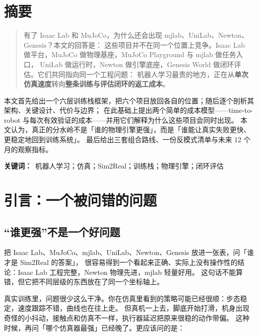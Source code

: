 \documentclass[UTF8, 11pt, a4paper, fontset=windows]{ctexart}
\begin{document}
\section*{摘要}

\begin{quote}
\noindent
有了 Isaac Lab 和 MuJoCo，为什么还会出现 mjlab、UniLab、Newton、Genesis？本文的回答是：
这些项目并不在同一个位置上竞争。Isaac Lab 做平台，MuJoCo 做物理基座，MuJoCo Playground 与 mjlab 做任务入口，
UniLab 做运行时，Newton 做引擎底座，Genesis World 做闭环评估。它们共同指向同一个工程问题：
机器人学习最贵的地方，正在从\textbf{单次仿真速度}转向\textbf{整条训练与评估闭环的返工成本}。
\end{quote}

\noindent
本文首先给出一个六层训练栈框架，把六个项目放回各自的位置；随后逐个剖析其架构、关键设计、代价与边界；
在此基础上提出两个简单的成本模型——time-to-robot 与每次有效验证的成本——并用它们解释为什么这些项目会同时出现。
本文认为，真正的分水岭不是「谁的物理引擎更强」，而是「谁能让真实失败更快、更稳定地回到训练系统」。
最后给出三套组合路线、一份反模式清单与未来 12 个月的观察指标。

\vspace{0.6em}
\noindent\textbf{关键词：}\ 机器人学习；仿真；Sim2Real；训练栈；物理引擎；闭环评估

\newpage
\tableofcontents
\newpage
{}
\setcounter{page}{1}

\section{引言：一个被问错的问题}

\subsection{“谁更强”不是一个好问题}

把 Isaac Lab、MuJoCo、mjlab、UniLab、Newton、Genesis 放进一张表，问「谁才是 Sim2Real 的答案」，
很容易得到一个看起来正确、实际上没有操作性的结论：Isaac Lab 工程完整，Newton 物理先进，mjlab 轻量好用。
这句话不能算错，但它把不同层级的东西放在了同一个坐标轴上。

真实训练里，问题很少这么干净。你在仿真里看到的策略可能已经很顺：步态稳定，速度跟踪不错，曲线也在往上走。
但真机一上去，脚底开始打滑，机身出现奇怪的小抖动，接触点和仿真不一样，执行器延迟把原来很稳的动作带偏。
这种时候，再问「哪个仿真器最强」已经晚了。更应该问的是：
\end{document}
